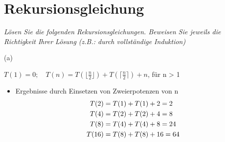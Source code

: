 										
\newcommand{\dozent}{Wolfgang Mulzer, Katharina Klost}					%
\newcommand{\tutor}{Tobias Gleißner}						%
\newcommand{\tutoriumNo}{02}				%
\newcommand{\ubungNo}{01}									%
\newcommand{\veranstaltung}{Algorithmen, Datenstrukturen und Datenabstraktion}	%
\newcommand{\semester}{Semester}						%
\newcommand{\studenten}{Nicolas Benjamin, Michael Wernitz}			%
\newcommand{\aufgNo}{3}	

\usepackage{amsmath}
\usepackage{mathtools}
\usepackage{letltxmacro}

							


\section{ Rekursionsgleichung \hfill}
{\itshape Lösen Sie die folgenden Rekursionsgleichungen. Beweisen Sie jeweils die Richtigkeit Ihrer Lösung (z.B.: durch vollständige Induktion)}

\begin{flushleft}
	(a)
\end{flushleft}

\begin{center}
$T(1) = 0; \quad T(n) = T\left(\lfloor{\frac{n}{2}}\rfloor\right) + T\left(\lceil{\frac{n}{2}}\rceil\right) + n$, für n > 1 
\end{center}



\begin{itemize}
\item  Ergebnisse durch Einsetzen von Zweierpotenzen von n\\
	\begin{equation}
		\begin{aligned}
		 	T(2) &= T(1) + T(1) + 2 = 2 \\
   			T(4) &= T(2) + T(2) + 4 = 8 \\
   			T(8) &= T(4) + T(4) + 8 = 24 \notag \\
   			T(16)&= T(8) + T(8) + 16 = 64 \\		
		\end{aligned}
	\end{equation}
	
\end{itemize}
 
